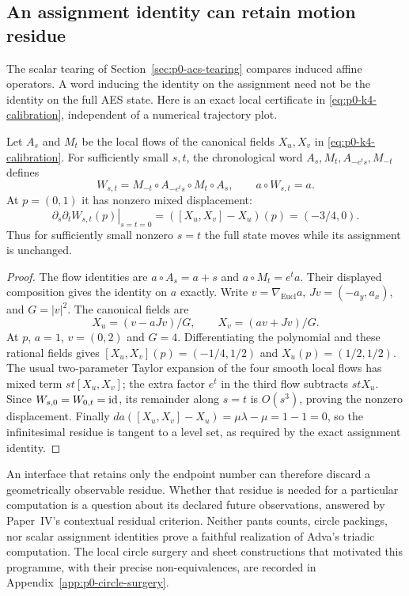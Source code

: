 \subsection{An assignment identity can retain motion residue}
\label{subsec:p0-motion-residue}

The scalar tearing of Section~\ref{sec:p0-acs-tearing} compares induced affine
operators.  A word inducing the identity on the assignment need not be the
identity on the full AES state.  Here is an exact local certificate in
\eqref{eq:p0-k4-calibration}, independent of a numerical trajectory plot.

\begin{proposition}
\label{prop:p0-k4-motion-residue}
Let $A_s$ and $M_t$ be the local flows of the canonical fields $X_u,X_v$ in
\eqref{eq:p0-k4-calibration}.  For sufficiently small $s,t$, the chronological
word $A_s,M_t,A_{-e^t s},M_{-t}$ defines
\[
 W_{s,t}=M_{-t}\circ A_{-e^t s}\circ M_t\circ A_s,
 \qquad a\circ W_{s,t}=a.
\]
At $p=(0,1)$ it has nonzero mixed displacement:
\[
 \left.\partial_s\partial_t W_{s,t}(p)\right|_{s=t=0}
 =([X_u,X_v]-X_u)(p)=(-3/4,0).
\]
Thus for sufficiently small nonzero $s=t$ the full state moves while its
assignment is unchanged.
\end{proposition}

\begin{proof}
The flow identities are $a\circ A_s=a+s$ and $a\circ M_t=e^t a$.
Their displayed composition gives the identity on $a$ exactly.  Write
$v=\nabla_{\mathrm{Eucl}}a$, $Jv=(-a_y,a_x)$, and $G=|v|^2$.  The canonical
fields are
\[
 X_u=(v-aJv)/G,\qquad X_v=(av+Jv)/G.
\]
At $p$, $a=1$, $v=(0,2)$ and $G=4$.  Differentiating the polynomial and these
rational fields gives
$[X_u,X_v](p)=(-1/4,1/2)$ and $X_u(p)=(1/2,1/2)$.
The usual two-parameter Taylor expansion of the four smooth local flows
has mixed term $st[X_u,X_v]$; the extra factor $e^t$ in the third flow
subtracts $stX_u$.  Since $W_{s,0}=W_{0,t}=\operatorname{id}$, its remainder along $s=t$
is $O(s^3)$, proving the nonzero displacement.  Finally
$da([X_u,X_v]-X_u)=\mu\lambda-\mu=1-1=0$,
so the infinitesimal residue is tangent to a level set, as required by the
exact assignment identity.
\end{proof}

An interface that retains only the endpoint number can therefore discard a
geometrically observable residue.  Whether that residue is needed for a
particular computation is a question about its declared future observations,
answered by Paper~IV's contextual residual criterion.  Neither pants counts,
circle packings, nor scalar assignment identities prove a faithful
realization of Adva's triadic computation.  The local circle surgery and
sheet constructions that motivated this programme, with their precise
non-equivalences, are recorded in Appendix~\ref{app:p0-circle-surgery}.

